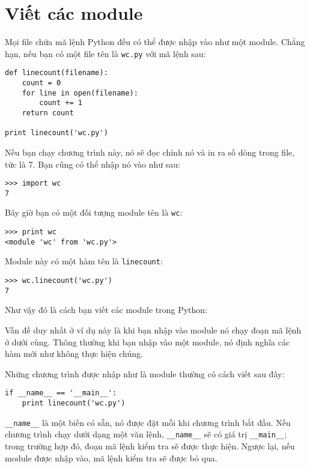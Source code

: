 \documentclass[11pt]{book}
\begin{document}
\section{Viết các module}
\label{modules}


Mọi file chứa mã lệnh Python đều có thể được nhập vào như một module.
Chẳng hạn, nếu bạn có một file tên là {\tt wc.py} với mã lệnh sau:

\beforeverb
\begin{verbatim}
def linecount(filename):
    count = 0
    for line in open(filename):
        count += 1
    return count

print linecount('wc.py')
\end{verbatim}
\afterverb
%
Nếu bạn chạy chương trình này, nó sẽ đọc chính nó và in ra số
dòng trong file, tức là 7.
Bạn cũng có thể nhập nó vào như sau:

\beforeverb
\begin{verbatim}
>>> import wc
7
\end{verbatim}
\afterverb
%
Bây giờ bạn có một đối tượng module tên là {\tt wc}:


\beforeverb
\begin{verbatim}
>>> print wc
<module 'wc' from 'wc.py'>
\end{verbatim}
\afterverb
%
Module này có một hàm tên là \verb"linecount":

\beforeverb
\begin{verbatim}
>>> wc.linecount('wc.py')
7
\end{verbatim}
\afterverb
%
Như vậy đó là cách bạn viết các module trong Python:

Vấn đề duy nhất ở ví dụ này là khi bạn nhập vào module nó
chạy đoạn mã lệnh ở dưới cùng. Thông thường khi bạn nhập
vào một module, nó định nghĩa các hàm mới như không
thực hiện chúng.


Những chương trình được nhập như là module thường có
cách viết sau đây:

\beforeverb
\begin{verbatim}
if __name__ == '__main__':
    print linecount('wc.py')
\end{verbatim}
\afterverb
%
\verb"__name__" là một biến có sẵn, nó được đặt mỗi khi 
chương trình bắt đầu. Nếu chương trình chạy dưới dạng
một văn lệnh, \verb"__name__" sẽ có giá trị \verb"__main__"; 
trong trường hợp đó, đoạn mã lệnh kiểm tra sẽ được thực hiện.
Ngược lại, nếu module được nhập vào, mã lệnh kiểm tra 
sẽ được bỏ qua.
\end{document}
